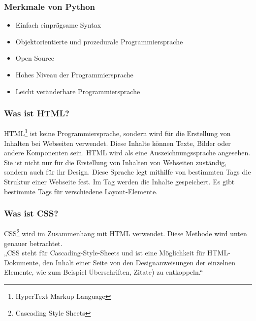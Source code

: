 \subsubsection{Merkmale von Python} 
\begin{itemize}
	\item Einfach einprägsame Syntax
\end{itemize}
\begin{itemize}
	\item Objektorientierte und prozedurale Programmiersprache
\end{itemize}
\begin{itemize}
	\item Open Source 
\end{itemize}
\begin{itemize}
	\item Hohes Niveau der Programmiersprache
\end{itemize}
\begin{itemize}
	\item Leicht veränderbare Programmiersprache\cite{50_python}
\end{itemize}
\subsubsection{Was ist HTML?} 
HTML\footnote{HyperText Markup Language} ist keine Programmiersprache, sondern wird für die Erstellung von Inhalten bei Webseiten verwendet. Diese Inhalte können Texte, Bilder oder andere Komponenten sein. HTML wird als eine Auszeichnungssprache angesehen. Sie ist nicht nur für die Erstellung von Inhalten von Webseiten zuständig, sondern auch für ihr Design. Diese Sprache legt mithilfe von bestimmten Tags die Struktur einer Webseite fest. Im Tag werden die Inhalte gespeichert. Es gibt bestimmte Tags für verschiedene Layout-Elemente.\cite{50_html} %
\subsubsection{Was ist CSS?} 
CSS\footnote{Cascading Style Sheets} wird im Zusammenhang mit HTML verwendet. Diese Methode wird unten genauer betrachtet. \\
„CSS steht für Cascading-Style-Sheets und ist eine Möglichkeit für HTML-Dokumente, den Inhalt einer Seite von den Designanweisungen der einzelnen Elemente, wie zum Beispiel Überschriften, Zitate) zu entkoppeln.“ \cite{50_css}
